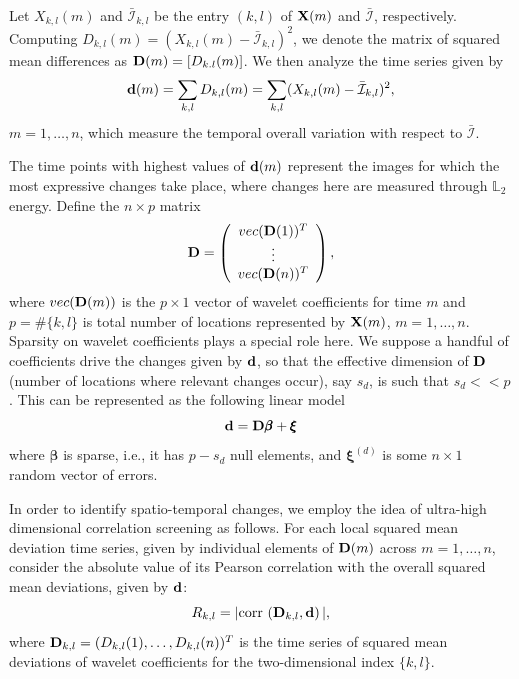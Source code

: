 \documentclass[journal]{IEEEtran}
\def\corr{\mbox{{\rm corr\,}}}
\newcommand{\vbeta}{\pmb{\beta}}
\newcommand{\vxi}{\pmb{\xi}}
\newcommand{\vD}{{\textbf D}}
\newcommand{\vd}{{\textbf d}}
\newcommand{\vX}{{\textbf X}}
\begin{document}
Let $X_{k,l}(m)$ and $\bar{\mathcal{I}}_{k,l}$ be the entry $(k,l)$ of $\vX(m)$ and $\bar{\mathcal{I}}$, respectively. Computing $D_{k,l}(m)=(X_{k,l}(m)-\bar{\mathcal{I}}_{k,l})^2$, we denote the matrix of squared mean differences as $\vD(m) = [D_{k.l}(m)]$. We then 
analyze the time series given by
\begin{equation} 
\vd(m)= \sum_{k,l}D_{k,l}(m) = \sum_{k,l}(X_{k,l}(m) - \bar{\mathcal{I}}_{k,l})^2,
\label{E:eq_defdm}
\end{equation}
$m=1,\ldots,n$, which measure the temporal overall variation with respect to $\bar{\mathcal{I}}$.

The time points with highest values of $\vd(m)$ represent the images for which the most expressive changes take place, where changes here are measured through $\mathbb{L}_2$ energy. Define the  $n\times p$ matrix
\begin{equation*}
 \vD=\left(
 \begin{array}{c}
 vec(\vD(1))^T\\
 \vdots\\
 vec(\vD(n))^T\\
 \end{array}
 \right),
\label{eq_defmatrixD}
\end{equation*}
where $vec(\vD(m))$ is the $p\times 1$ vector of wavelet coefficients for time $m$ and $p=\#\{k,l\}$ is total number of locations represented by $\vX(m)$, $m=1,\ldots,n$. Sparsity \cite{johnstone2009statistical} on wavelet coefficients plays a special role here.  We suppose a handful of coefficients drive the changes given by $\vd$, so that the effective dimension of $\vD$ (number of locations where relevant changes occur), say $s_d$, is such that $s_d<<p$. This can be represented as the following linear model
\begin{equation} 
\vd=\vD\vbeta+\vxi
\label{E:sparsemodel_d}
\end{equation}
where $\vbeta$ is sparse, i.e., it has $p-s_d$ null elements, and $\vxi^{(d)}$ is some $n\times 1$ random vector of errors.

In order to identify spatio-temporal changes, we employ the idea of ultra-high dimensional correlation screening \cite{fan2020statistical} as follows. For each local squared mean deviation time series, given by individual elements of $\vD(m)$ across $m=1,\ldots,n$, consider the absolute value of its Pearson correlation with the overall squared mean deviations, given by $\vd$:
\begin{equation*}
R_{k,l}= |\corr\left( \vD_{k,l}, \vd\right)|,
\label{def_Rkld}
\end{equation*}
where $\vD_{k,l}=(D_{k,l}(1),\ldots,D_{k,l}(n))^T$ is the time series of squared mean deviations of wavelet coefficients for the two-dimensional index $\{k,l\}$.
\end{document}
